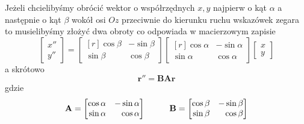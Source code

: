 \documentclass[12pt,a4paper,leqno]{article}
\numberwithin{equation}{section}
\begin{document}
Jeżeli chcielibyśmy obrócić wektor o współrzędnych $x, y$ najpierw o kąt $\alpha$ a następnie o kąt $\beta$
wokół osi $Oz$
przeciwnie do kierunku ruchu wskazówek zegara to musielibyśmy złożyć dwa obroty co odpowiada w macierzowym zapisie
\begin{equation}
\begin{bmatrix}
x'' \\ 
y'' 
\end{bmatrix}
=
\begin{bmatrix*}[r]
 \cos \beta  & -\sin \beta  \\
 \sin \beta  &  \cos \beta
\end{bmatrix*}
\begin{bmatrix*}[r]
 \cos \alpha  & -\sin \alpha  \\
 \sin \alpha  &  \cos \alpha
\end{bmatrix*}
\begin{bmatrix}
x \\ 
y 
\end{bmatrix}
\end{equation}
a skrótowo
\begin{equation}
\mathbf{r}'' =    \mathbf{B} \mathbf{A} \mathbf{r}
\end{equation}
gdzie
\begin{equation}
\mathbf{A}
=
\begin{bmatrix*}[r]
 \cos \alpha  & -\sin \alpha  \\
 \sin \alpha  &  \cos \alpha
\end{bmatrix*}
\hspace{1.0cm}
\mathbf{B}
=
\begin{bmatrix*}[r]
 \cos \beta  & -\sin \beta  \\
 \sin \beta  &  \cos \beta
\end{bmatrix*}
\end{equation}
\end{document}
